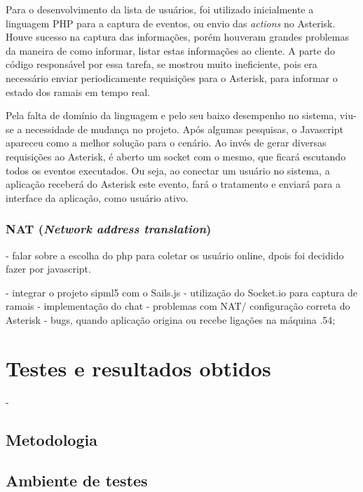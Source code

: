 \documentclass[ruledheader]{abnt} %
\begin{document}
  Para o desenvolvimento da lista de usuários, foi utilizado inicialmente a linguagem PHP para a captura de eventos, ou envio das \textit{actions} no Asterisk. Houve sucesso na captura das informações, porém houveram grandes problemas da maneira de como informar, listar estas informações ao cliente. 
  A parte do código responsável por essa tarefa, se mostrou muito ineficiente, pois era necessário enviar periodicamente requisições para o Asterisk, para informar o estado dos ramais em tempo real. 
  
  Pela falta de domínio da linguagem e pelo seu baixo desempenho no sistema, viu-se a necessidade de mudança no projeto. Após algumas pesquisas, o Javascript apareceu como a melhor solução para o cenário.  Ao invés de gerar diversas requisições ao Asterisk, é aberto um socket com o mesmo, que ficará escutando todos os eventos executados. Ou seja, ao conectar um usuário no sistema, a aplicação receberá do Asterisk este evento, fará o tratamento e enviará para a interface da aplicação, como usuário ativo. 
 
\subsection{NAT (\textit{Network address translation})}
  
- falar sobre a escolha do php para coletar os usuário online, dpois foi decidido fazer por javascript.

- integrar o projeto sipml5 com o Sails.js
- utilização do Socket.io para captura de ramais
- implementação do chat
- problemas com NAT/ configuração correta do Asterisk
- bugs, quando aplicação origina ou recebe ligações na máquina .54;


\chapter{Testes e resultados obtidos}
\label{c_testeEresultados}
- 

\section{Metodologia}
\label{s_metodologia} %

\section{Ambiente de testes}
\label{s_ambienteDetestes} %
\end{document}
